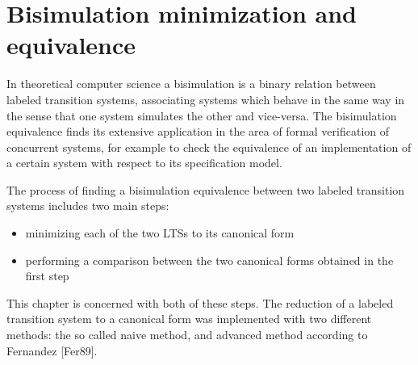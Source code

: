 \section{Bisimulation minimization and equivalence}
In theoretical computer science a bisimulation is a binary relation between labeled transition systems, 
associating systems which behave in the same way in the sense that one system simulates the other and
vice-versa. The bisimulation equivalence finds its extensive application in the area of formal
verification of concurrent systems, for example to check the equivalence of an implementation of a
certain system with respect to its specification model. 

The process of finding a bisimulation equivalence between two labeled transition systems includes 
two main steps:
\begin{itemize}
\item minimizing each of the two LTSs to its canonical form
\item performing a comparison between the two canonical forms obtained in the first step
\end{itemize}

This chapter is concerned with both of these steps. The reduction of a labeled transition system
to a canonical form was implemented with two different methods: the so called naive method, and
advanced method according to Fernandez [Fer89].